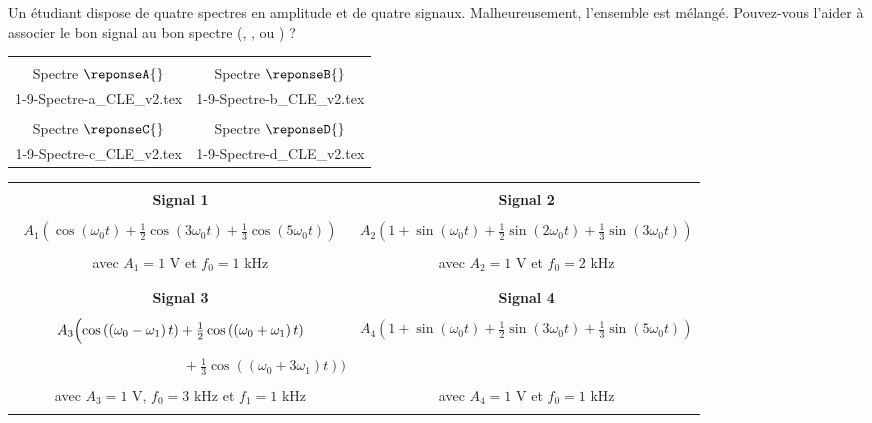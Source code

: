 Un étudiant dispose de quatre spectres en amplitude et de quatre signaux. Malheureusement, l'ensemble est mélangé.
Pouvez-vous l'aider à associer le bon signal au bon spectre (\reponseA{}, \reponseB{}, \reponseC{} ou \reponseD{}) ?   
%
%
\begin{center}
	\begin{tabular}{|c|c|}
		\hline	
		 &  \\
		 Spectre $\reponseA{}$ & Spectre $\reponseB{}$\\[2mm]
		{1-9-Spectre-a_CLE_v2.tex} & {1-9-Spectre-b_CLE_v2.tex}\\
		\hline
		 &  \\
		 Spectre $\reponseC{}$ & Spectre $\reponseD{}$\\[2mm]
		{1-9-Spectre-c_CLE_v2.tex} & {1-9-Spectre-d_CLE_v2.tex}\\
		\hline
	\end{tabular}
\end{center} 
%
\begin{center}
	\begin{tabular}{|c|c|}
		\hline	
		  &  \\
		\textbf{Signal \no{}1} &\textbf{Signal \no{}2}\\[2mm]
		  &  \\
		$A_1\left(\cos\left(\omega_0 t\right)+\frac{1}{2}\cos\left(3\omega_0 t\right)+\frac{1}{3}\cos\left(5\omega_0 t\right)\right)$	 & $A_2\left(1+\sin\left(\omega_0 t\right)+\frac{1}{2}\sin\left(2\omega_0 t\right)+\frac{1}{3}\sin\left(3\omega_0 t\right)\right)$
	\\
	  &  \\
			avec $A_1=1$ V et $f_0=1$ kHz & avec $A_2=1$ V et $f_0=2$ kHz \\
			  &  \\
		\hline
		  &  \\
			\textbf{Signal \no{}3} & \textbf{Signal \no{}4}\\[2mm]
		&  \\
		$A_3\Bigl(\cos\left(\left(\omega_0-\omega_1\right) t\right)+\frac{1}{2}\cos\left(\left(\omega_0+\omega_1\right) t\right)$&  $A_4\left(1+\sin\left(\omega_0 t\right)+\frac{1}{2}\sin\left(3\omega_0 t\right)+\frac{1}{3}\sin\left(5\omega_0 t\right)\right)$
		\\
		&  \\
		$\qquad\qquad\qquad\qquad\qquad\qquad{} +\frac{1}{3}\cos\left(\left(\omega_0+3\omega_1\right) t\right)\Bigr)$& \\
		&  \\
		avec $A_3=1$ V, $f_0=3$ kHz et  $f_1=1$ kHz & avec $A_4=1$ V et $f_0=1$ kHz \\
		&  \\
		\hline
	\end{tabular}
\end{center}                       

